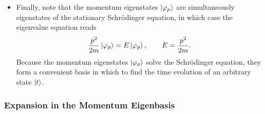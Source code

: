 \documentclass[11pt, a4paper]{article}
\newcommand{\Schro}{Schr\"{o}dinger\xspace}
\begin{document}
\begin{itemize}
    \item Finally, note that the momentum eigenstates $ \ket{\varphi_{p}} $ are simultaneously eigenstates of the stationary \Schro equation, in which case the eigenvalue equation reads
    \begin{equation*}
        \frac{\hat{p}^{2}}{2m}\ket{\varphi_{p}} = E \ket{\varphi_{p}}, \qquad E = \frac{p^{2}}{2m}.
    \end{equation*}
    Because the momentum eigenstates $ \ket{\varphi_{p}} $ solve the \Schro equation, they form a convenient basis in which to find the time evolution of an arbitrary state $ \ket{t} $.

    

\end{itemize}

\subsubsection{Expansion in the Momentum Eigenbasis}
\end{document}
